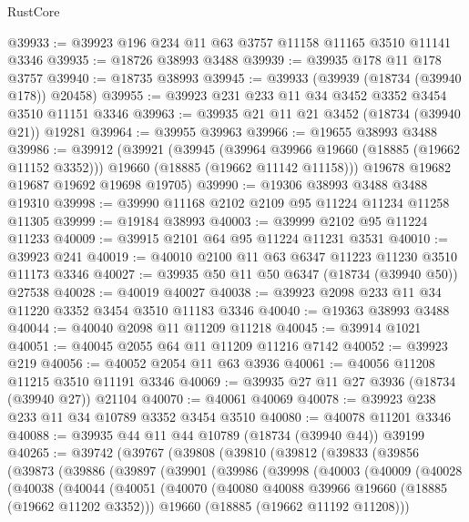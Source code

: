 \begin{lexlean}{RustCore}
\begin{coremodule}
@39933 := @39923 @196 @234 @11 @63 @3757 @11158 @11165 @3510 @11141 @3346
@39935 := @18726 @38993 @3488
@39939 := @39935 @178 @11 @178 @3757
@39940 := @18735 @38993
@39945 := @39933 (@39939 (@18734 (@39940 @178)) @20458)
@39955 := @39923 @231 @233 @11 @34 @3452 @3352 @3454 @3510 @11151 @3346
@39963 := @39935 @21 @11 @21 @3452 (@18734 (@39940 @21)) @19281
@39964 := @39955 @39963
@39966 := @19655 @38993 @3488
@39986 := @39912
    (@39921
      (@39945
        (@39964 @39966 @19660 (@18885 (@19662 @11152 @3352)))
        @19660
        (@18885 (@19662 @11142 @11158)))
      @19678
      @19682
      @19687
      @19692
      @19698
      @19705)
@39990 := @19306 @38993 @3488 @3488 @19310
@39998 := @39990 @11168 @2102 @2109 @95 @11224 @11234 @11258 @11305
@39999 := @19184 @38993
@40003 := @39999 @2102 @95 @11224 @11233
@40009 := @39915 @2101 @64 @95 @11224 @11231 @3531
@40010 := @39923 @241
@40019 := @40010 @2100 @11 @63 @6347 @11223 @11230 @3510 @11173 @3346
@40027 := @39935 @50 @11 @50 @6347 (@18734 (@39940 @50)) @27538
@40028 := @40019 @40027
@40038 := @39923 @2098 @233 @11 @34 @11220 @3352 @3454 @3510 @11183 @3346
@40040 := @19363 @38993 @3488
@40044 := @40040 @2098 @11 @11209 @11218
@40045 := @39914 @1021
@40051 := @40045 @2055 @64 @11 @11209 @11216 @7142
@40052 := @39923 @219
@40056 := @40052 @2054 @11 @63 @3936
@40061 := @40056 @11208 @11215 @3510 @11191 @3346
@40069 := @39935 @27 @11 @27 @3936 (@18734 (@39940 @27)) @21104
@40070 := @40061 @40069
@40078 := @39923 @238 @233 @11 @34 @10789 @3352 @3454 @3510
@40080 := @40078 @11201 @3346
@40088 := @39935 @44 @11 @44 @10789 (@18734 (@39940 @44)) @39199
@40265 := @39742
    (@39767
      (@39808
        (@39810
          (@39812
            (@39833
              (@39856
                (@39873
                  (@39886
                    (@39897
                      (@39901
                        (@39986
                          (@39998
                            (@40003
                              (@40009
                                (@40028
                                  (@40038
                                    (@40044
                                      (@40051
                                        (@40070
                                          (@40080
                                            @40088
                                            @39966
                                            @19660
                                            (@18885 (@19662 @11202 @3352)))
                                          @19660
                                          (@18885 (@19662 @11192 @11208)))

\end{coremodule}
\end{lexlean}
